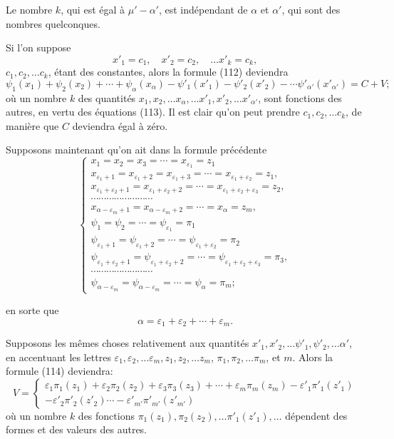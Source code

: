 \documentclass{article}
\begin{document}
Le nombre $k$, qui est égal à $\mu'-\alpha'$, est indépendant de $\alpha$ et $\alpha'$, qui sont des nombres quelconques.

Si l'on suppose
\[ x'_1 = c_1, \quad x'_2 = c_2, \quad \ldots x'_k = c_k, \tag{113} \]
$c_1, c_2, \ldots c_k$, étant des constantes, alors la formule (112) deviendra
\[ \psi_1(x_1)+\psi_2(x_2)+\cdots+\psi_\alpha(x_\alpha)-\psi'_1(x'_1)-\psi'_2(x'_2)-\cdots\psi'_{\alpha'}(x'_{\alpha'}) = C+V; \tag{114} \]
où un nombre $k$ des quantités $x_1, x_2, \ldots x_\alpha, \ldots x'_1, x'_2, \ldots x'_{\alpha'}$, sont fonctions des autres, en vertu des équations (113). Il est clair qu'on peut prendre $c_1, c_2, \ldots c_k$, de manière que $C$ deviendra égal à zéro.

Supposons maintenant qu'on ait dans la formule précédente
\[ \begin{cases}
x_1 = x_2 = x_3 = \cdots = x_{\varepsilon_1} = z_1 \\
x_{\varepsilon_1+1} = x_{\varepsilon_1+2} = x_{\varepsilon_1+3} = \cdots = x_{\varepsilon_1+\varepsilon_2} = z_1, \\
x_{\varepsilon_1+\varepsilon_2+1} = x_{\varepsilon_1+\varepsilon_2+2} = \cdots = x_{\varepsilon_1+\varepsilon_2+\varepsilon_3} = z_2, \\
\cdots\cdots\cdots\cdots\cdots\cdots\cdots\cdots \\
x_{\alpha-\varepsilon_m+1} = x_{\alpha-\varepsilon_m+2} = \cdots = x_\alpha = z_m, \\
\psi_1 = \psi_2 = \cdots = \psi_{\varepsilon_1} = \pi_1 \\
\psi_{\varepsilon_1+1} = \psi_{\varepsilon_1+2} = \cdots = \psi_{\varepsilon_1+\varepsilon_2} = \pi_2 \\
\psi_{\varepsilon_1+\varepsilon_2+1} = \psi_{\varepsilon_1+\varepsilon_2+2} = \cdots = \psi_{\varepsilon_1+\varepsilon_2+\varepsilon_3} = \pi_3, \\
\cdots\cdots\cdots\cdots\cdots\cdots\cdots\cdots \\
\psi_{\alpha-\varepsilon_m} = \psi_{\alpha-\varepsilon_m} = \cdots = \psi_\alpha = \pi_m;
\end{cases} \tag{115} \]

en sorte que
\[ \alpha = \varepsilon_1+\varepsilon_2+\cdots+\varepsilon_m. \]

Supposons les mêmes choses relativement aux quantités $x'_1, x'_2, \ldots \psi'_1, \psi'_2, \ldots \alpha'$, en accentuant les lettres $\varepsilon_1, \varepsilon_2, \ldots \varepsilon_m, z_1, z_2, \ldots z_m$, $\pi_1, \pi_2, \ldots \pi_m$, et $m$. Alors la formule (114) deviendra:
\[ V = \begin{cases} \varepsilon_1\pi_1(z_1)+\varepsilon_2\pi_2(z_2)+\varepsilon_3\pi_3(z_3)+\cdots+\varepsilon_m\pi_m(z_m)-\varepsilon'_1\pi'_1(z'_1) \\ -\varepsilon'_2\pi'_2(z'_2)\cdots-\varepsilon'_{m'}\pi'_{m'}(z'_{m'}) \end{cases} \tag{116} \]
où un nombre $k$ des fonctions $\pi_1(z_1), \pi_2(z_2), \ldots \pi'_1(z'_1), \ldots$ dépendent des formes et des valeurs des autres.
\end{document}
